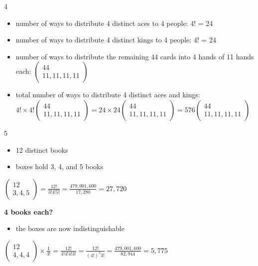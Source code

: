 \documentclass[12 pt]{article}
\begin{document}
    \begin{exercise}{4}
    \hfill

    \begin{itemize}
        \item number of ways to distribute 4 distinct aces to 4 people: 4! = 24
        \item number of ways to distribute 4 distinct kings to 4 people: 4! = 24
        \item number of ways to distribute the remaining 44 cards into 4 hands of 11 hands each: $\begin{pmatrix}
            44 \\
            11, 11, 11, 11
        \end{pmatrix}$
        \item total number of ways to distribute 4 distinct aces and kings: $4! \times 4! \begin{pmatrix}
            44 \\
            11, 11, 11, 11
        \end{pmatrix}= 24 \times 24 \begin{pmatrix}
            44 \\
            11, 11, 11, 11
        \end{pmatrix}= 576 \begin{pmatrix}
            44 \\
            11, 11, 11, 11
        \end{pmatrix}$
    \end{itemize}
        
    \end{exercise}



    \begin{exercise}{5}
    \hfill

    \begin{itemize}
        \item 12 distinct books
        \item boxes hold 3, 4, and 5 books
    \end{itemize}

    $\begin{pmatrix}
        12 \\
        3, 4, 5
    \end{pmatrix} = \frac{12!}{3!4!5!} = \frac{479,001,600}{17,280} = 27,720$

    \textbf{4 books each?}
    \begin{itemize}
        \item the boxes are now indistinguishable
    \end{itemize}

    $\begin{pmatrix}
        12 \\
        4, 4, 4
    \end{pmatrix} \times \frac{1}{3!} = \frac{12!}{4!4!4!3!} = \frac{12!}{(4!)^3 3!} = \frac{479,001,600}{82,944} = 5,775$   
    \end{exercise}
\end{document}
